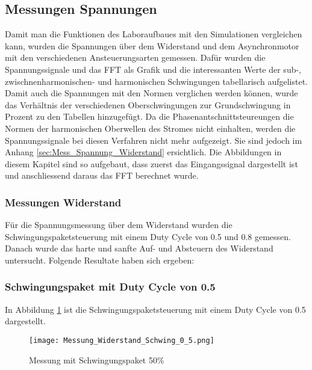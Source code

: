 \subsection{Messungen Spannungen}
Damit man die Funktionen des Laboraufbaues mit den Simulationen vergleichen kann, wurden die Spannungen über dem Widerstand und dem Asynchronmotor mit den verschiedenen Ansteuerungsarten gemessen. Dafür wurden die Spannungssignale und das FFT als Grafik und die interessanten Werte der sub-, zwischnenharmonischen- und harmonischen Schwingungen tabellarisch aufgelistet. Damit auch die Spannungen mit den Normen verglichen werden können, wurde das Verhältnis der verschiedenen Oberschwingungen zur Grundschwingung in Prozent zu den Tabellen hinzugefügt. Da die Phasenantschnittsteureungen die Normen der harmonischen Oberwellen des Stromes nicht einhalten, werden die Spannungssignale bei diesen Verfahren nicht mehr aufgezeigt. Sie sind jedoch im Anhang \ref{sec:Mess_Spannung_Widerstand} ersichtlich. Die Abbildungen in diesem Kapitel sind so aufgebaut, dass zuerst das Eingangssignal dargestellt ist und anschliessend daraus das FFT berechnet wurde.

\subsubsection{Messungen Widerstand}
Für die Spannungsmessung über dem Widerstand wurden die Schwingungspaketsteuerung mit einem Duty Cycle von 0.5 und 0.8 gemessen. Danach wurde das harte und sanfte Auf- und Absteuern des Widerstand untersucht. Folgende Resultate haben sich ergeben:


\subsubsection*{Schwingungspaket mit Duty Cycle von 0.5}

In Abbildung \ref{fig:Mess_Schwing_50} ist die Schwingungspaketsteuerung mit einem Duty Cycle von 0.5 dargestellt.


\begin{figure}[ht!]
	\centering
	\texttt{[image: Messung\_Widerstand\_Schwing\_0\_5.png]}	
	\caption{Messung mit Schwingungspaket 50\%}\label{fig:Mess_Schwing_50}
\end{figure}


